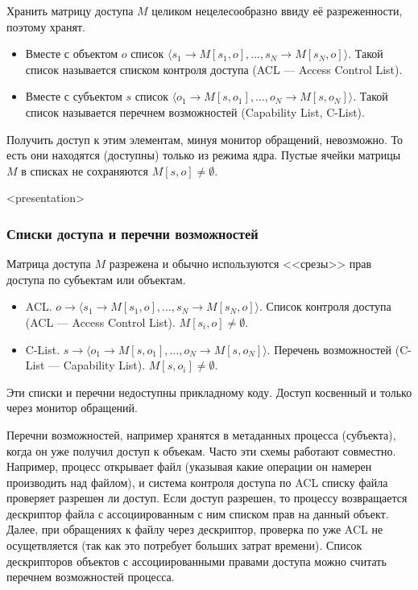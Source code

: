 Хранить матрицу доступа $M$ целиком нецелесообразно ввиду её разреженности, поэтому хранят.
\begin{itemize}
    \item Вместе с объектом $o$ список $\langle s_1\to M[s_1,o],\ldots,s_N\to M[s_N,o]\rangle$. 
        Такой список называется списком контроля доступа (ACL --- Access Control List).
    \item Вместе с субъектом $s$ список $\langle o_1\to M[s,o_1],\ldots,o_N\to M[s,o_N]\rangle$. 
        Такой список называется перечнем возможностей (Capability List, C-List).
\end{itemize}
Получить доступ к этим элементам, минуя монитор обращений, невозможно. То есть они находятся (доступны) только из режима ядра. Пустые ячейки матрицы $M$ в списках не сохраняются $M[s,o]\neq\emptyset$.


\begin{frame}<presentation>
    \frametitle{Списки доступа и перечни возможностей}
    Матрица доступа $M$ разрежена и обычно используются <<срезы>> прав доступа по субъектам или объектам.
    \begin{itemize}
        \item ACL. $o\to\langle s_1\to M[s_1,o],\ldots,s_N\to M[s_N,o]\rangle$. 
            Список контроля доступа (ACL --- Access Control List). $M[s_i,o]\neq\emptyset$.
        \item C-List. $s\to\langle o_1\to M[s,o_1],\ldots,o_N\to M[s,o_N]\rangle$. 
            Перечень возможностей (C-List --- Capability List). $M[s,o_i]\neq\emptyset$.
    \end{itemize}
    
    Эти списки и перечни недоступны прикладному коду. Доступ косвенный и только через монитор обращений.
\end{frame}

Перечни возможностей, например хранятся в метаданных процесса (субъекта), когда он уже получил доступ к объекам. Часто эти схемы работают совместно. Например, процесс открывает файл (указывая какие операции он намерен производить над файлом), и система контроля доступа по ACL списку файла проверяет разрешен ли доступ. Если доступ разрешен, то процессу возвращается дескриптор файла с ассоциированным с ним списком прав на данный объект. Далее, при обращениях к файлу через дескриптор, проверка по уже ACL не осущетвляется (так как это потребует больших затрат времени). Список дескрипторов объектов с ассоциированными правами доступа можно считать перечнем возможностей процесса.


